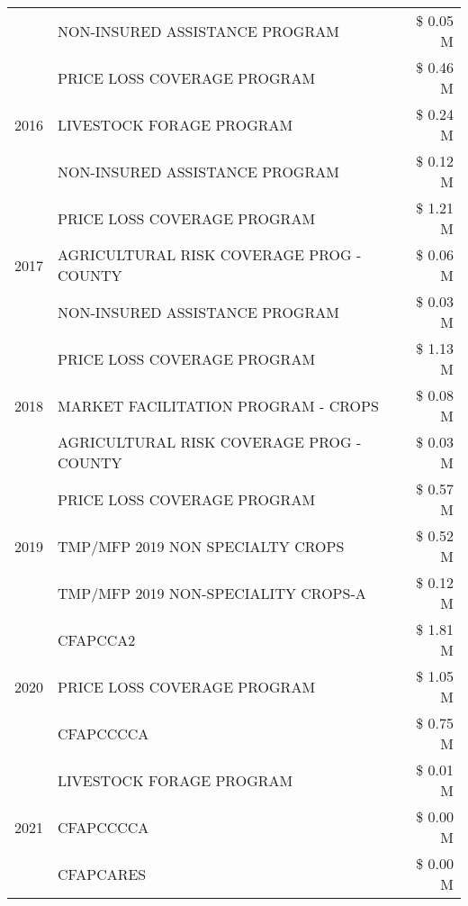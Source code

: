 \begin{tabular}{llr}
 & NON-INSURED ASSISTANCE PROGRAM & \$ 0.05 M \\
\cline{1-3}
\multirow[t]{3}{*}{2016} & PRICE LOSS COVERAGE PROGRAM                   & \$ 0.46 M \\
 & LIVESTOCK FORAGE PROGRAM                      & \$ 0.24 M \\
 & NON-INSURED ASSISTANCE PROGRAM                & \$ 0.12 M \\
\cline{1-3}
\multirow[t]{3}{*}{2017} & PRICE LOSS COVERAGE PROGRAM & \$ 1.21 M \\
 & AGRICULTURAL RISK COVERAGE PROG - COUNTY & \$ 0.06 M \\
 & NON-INSURED ASSISTANCE PROGRAM & \$ 0.03 M \\
\cline{1-3}
\multirow[t]{3}{*}{2018} & PRICE LOSS COVERAGE PROGRAM & \$ 1.13 M \\
 & MARKET FACILITATION PROGRAM - CROPS & \$ 0.08 M \\
 & AGRICULTURAL RISK COVERAGE PROG - COUNTY & \$ 0.03 M \\
\cline{1-3}
\multirow[t]{3}{*}{2019} & PRICE LOSS COVERAGE PROGRAM & \$ 0.57 M \\
 & TMP/MFP 2019 NON SPECIALTY CROPS & \$ 0.52 M \\
 & TMP/MFP 2019 NON-SPECIALITY CROPS-A & \$ 0.12 M \\
\cline{1-3}
\multirow[t]{3}{*}{2020} & CFAPCCA2 & \$ 1.81 M \\
 & PRICE LOSS COVERAGE PROGRAM & \$ 1.05 M \\
 & CFAPCCCCA & \$ 0.75 M \\
\cline{1-3}
\multirow[t]{3}{*}{2021} & LIVESTOCK FORAGE PROGRAM & \$ 0.01 M \\
 & CFAPCCCCA & \$ 0.00 M \\
 & CFAPCARES & \$ 0.00 M \\
\cline{1-3}
\bottomrule
\end{tabular}
